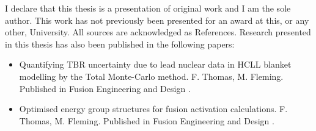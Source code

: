 
\begin{declaration}

I declare that this thesis is a presentation of original work and I am the sole author. This work has not previously been presented for an award at this, or any other, University. All sources are acknowledged as References. Research presented in this thesis has also been published in the following papers:

\begin{itemize}
  \item Quantifying TBR uncertainty due to lead nuclear data in HCLL blanket modelling by the Total Monte-Carlo method. F. Thomas, M. Fleming. Published in Fusion Engineering and Design \cite{Thomas2017}.

  \item Optimised energy group structures for fusion activation calculations. F. Thomas, M. Fleming. Published in Fusion Engineering and Design \cite{Thomas2018}.
\end{itemize}

\end{declaration}
